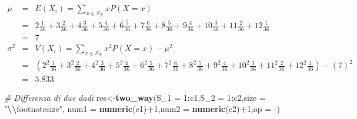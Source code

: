\documentclass[
  11pt,
]{book}
\newenvironment{Shaded}{\begin{snugshade}}{\end{snugshade}}
\newcommand{\AttributeTok}[1]{\textcolor[rgb]{0.13,0.29,0.53}{#1}}
\newcommand{\CommentTok}[1]{\textcolor[rgb]{0.56,0.35,0.01}{\textit{#1}}}
\newcommand{\DecValTok}[1]{\textcolor[rgb]{0.00,0.00,0.81}{#1}}
\newcommand{\FunctionTok}[1]{\textcolor[rgb]{0.13,0.29,0.53}{\textbf{#1}}}
\newcommand{\NormalTok}[1]{#1}
\newcommand{\OtherTok}[1]{\textcolor[rgb]{0.56,0.35,0.01}{#1}}
\newcommand{\SpecialCharTok}[1]{\textcolor[rgb]{0.81,0.36,0.00}{\textbf{#1}}}
\newcommand{\StringTok}[1]{\textcolor[rgb]{0.31,0.60,0.02}{#1}}
\theoremstyle{mytheoremstyle}
\theoremstyle{mydefstyle}
\begin{document}
\footnotesize

\begin{eqnarray*} \mu &=& E(X_i) = \sum_{x\in S_X}x P(X=x)\\ 
 &=&  2  \frac { 1 }{ 36 }+ 3  \frac { 2 }{ 36 }+ 4  \frac { 3 }{ 36 }+ 5  \frac { 4 }{ 36 }+ 6  \frac { 5 }{ 36 }+ 7  \frac { 6 }{ 36 }+ 8  \frac { 5 }{ 36 }+ 9  \frac { 4 }{ 36 }+ 10  \frac { 3 }{ 36 }+ 11  \frac { 2 }{ 36 }+ 12  \frac { 1 }{ 36 } \\ 
            &=& 7 \\ 
 \sigma^2 &=& V(X_i) = \sum_{x\in S_X}x^2 P(X=x)-\mu^2\\ 
 &=&\left(  2  ^2\frac { 1 }{ 36 }+ 3  ^2\frac { 2 }{ 36 }+ 4  ^2\frac { 3 }{ 36 }+ 5  ^2\frac { 4 }{ 36 }+ 6  ^2\frac { 5 }{ 36 }+ 7  ^2\frac { 6 }{ 36 }+ 8  ^2\frac { 5 }{ 36 }+ 9  ^2\frac { 4 }{ 36 }+ 10  ^2\frac { 3 }{ 36 }+ 11  ^2\frac { 2 }{ 36 }+ 12  ^2\frac { 1 }{ 36 } \right)-( 7 )^2\\ 
            &=& 5.833 
\end{eqnarray*}
\normalsize

\begin{Shaded}
\begin{Highlighting}[]
\CommentTok{\# Differenza di due dadi}
\NormalTok{res}\OtherTok{\textless{}{-}}\FunctionTok{two\_way}\NormalTok{(}\AttributeTok{S\_1 =} \DecValTok{1}\SpecialCharTok{:}\NormalTok{c1,}\AttributeTok{S\_2 =} \DecValTok{1}\SpecialCharTok{:}\NormalTok{c2,}\AttributeTok{size =} \StringTok{"}\SpecialCharTok{\textbackslash{}\textbackslash{}}\StringTok{footnotesize"}\NormalTok{,}
             \AttributeTok{num1 =} \FunctionTok{numeric}\NormalTok{(c1)}\SpecialCharTok{+}\DecValTok{1}\NormalTok{,}\AttributeTok{num2 =} \FunctionTok{numeric}\NormalTok{(c2)}\SpecialCharTok{+}\DecValTok{1}\NormalTok{,}\AttributeTok{op =} \StringTok{\textasciigrave{}}\AttributeTok{{-}}\StringTok{\textasciigrave{}}\NormalTok{)}
\end{Highlighting}
\end{Shaded}

\footnotesize
\end{document}
